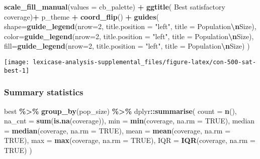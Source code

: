 \documentclass[
]{book}
\newenvironment{Shaded}{\begin{snugshade}}{\end{snugshade}}
\newcommand{\AttributeTok}[1]{\textcolor[rgb]{0.13,0.29,0.53}{#1}}
\newcommand{\ConstantTok}[1]{\textcolor[rgb]{0.56,0.35,0.01}{#1}}
\newcommand{\DecValTok}[1]{\textcolor[rgb]{0.00,0.00,0.81}{#1}}
\newcommand{\FunctionTok}[1]{\textcolor[rgb]{0.13,0.29,0.53}{\textbf{#1}}}
\newcommand{\NormalTok}[1]{#1}
\newcommand{\SpecialCharTok}[1]{\textcolor[rgb]{0.81,0.36,0.00}{\textbf{#1}}}
\newcommand{\StringTok}[1]{\textcolor[rgb]{0.31,0.60,0.02}{#1}}
\begin{document}
\begin{Shaded}
\begin{Highlighting}[]
  \FunctionTok{scale\_fill\_manual}\NormalTok{(}\AttributeTok{values =}\NormalTok{ cb\_palette) }\SpecialCharTok{+}
  \FunctionTok{ggtitle}\NormalTok{(}\StringTok{\textquotesingle{}  Best satisfactory coverage\textquotesingle{}}\NormalTok{)}\SpecialCharTok{+}
\NormalTok{  p\_theme }\SpecialCharTok{+} \FunctionTok{coord\_flip}\NormalTok{() }\SpecialCharTok{+}
  \FunctionTok{guides}\NormalTok{(}
    \AttributeTok{shape=}\FunctionTok{guide\_legend}\NormalTok{(}\AttributeTok{nrow=}\DecValTok{2}\NormalTok{, }\AttributeTok{title.position =} \StringTok{"left"}\NormalTok{, }\AttributeTok{title =} \StringTok{\textquotesingle{}Population}\SpecialCharTok{\textbackslash{}n}\StringTok{Size\textquotesingle{}}\NormalTok{),}
    \AttributeTok{color=}\FunctionTok{guide\_legend}\NormalTok{(}\AttributeTok{nrow=}\DecValTok{2}\NormalTok{, }\AttributeTok{title.position =} \StringTok{"left"}\NormalTok{, }\AttributeTok{title =} \StringTok{\textquotesingle{}Population}\SpecialCharTok{\textbackslash{}n}\StringTok{Size\textquotesingle{}}\NormalTok{),}
    \AttributeTok{fill=}\FunctionTok{guide\_legend}\NormalTok{(}\AttributeTok{nrow=}\DecValTok{2}\NormalTok{, }\AttributeTok{title.position =} \StringTok{"left"}\NormalTok{, }\AttributeTok{title =} \StringTok{\textquotesingle{}Population}\SpecialCharTok{\textbackslash{}n}\StringTok{Size\textquotesingle{}}\NormalTok{)}
\NormalTok{  )}
\end{Highlighting}
\end{Shaded}

\texttt{[image: lexicase-analysis-supplemental\_files/figure-latex/con-500-sat-best-1]}

\hypertarget{summary-statistics-6}{%
\subsubsection{Summary statistics}\label{summary-statistics-6}}

\begin{Shaded}
\begin{Highlighting}[]
\NormalTok{best }\SpecialCharTok{\%\textgreater{}\%}
  \FunctionTok{group\_by}\NormalTok{(pop\_size) }\SpecialCharTok{\%\textgreater{}\%}
\NormalTok{  dplyr}\SpecialCharTok{::}\FunctionTok{summarise}\NormalTok{(}
    \AttributeTok{count =} \FunctionTok{n}\NormalTok{(),}
    \AttributeTok{na\_cnt =} \FunctionTok{sum}\NormalTok{(}\FunctionTok{is.na}\NormalTok{(coverage)),}
    \AttributeTok{min =} \FunctionTok{min}\NormalTok{(coverage, }\AttributeTok{na.rm =} \ConstantTok{TRUE}\NormalTok{),}
    \AttributeTok{median =} \FunctionTok{median}\NormalTok{(coverage, }\AttributeTok{na.rm =} \ConstantTok{TRUE}\NormalTok{),}
    \AttributeTok{mean =} \FunctionTok{mean}\NormalTok{(coverage, }\AttributeTok{na.rm =} \ConstantTok{TRUE}\NormalTok{),}
    \AttributeTok{max =} \FunctionTok{max}\NormalTok{(coverage, }\AttributeTok{na.rm =} \ConstantTok{TRUE}\NormalTok{),}
    \AttributeTok{IQR =} \FunctionTok{IQR}\NormalTok{(coverage, }\AttributeTok{na.rm =} \ConstantTok{TRUE}\NormalTok{)}
\NormalTok{  )}
\end{Highlighting}
\end{Shaded}
\end{document}
